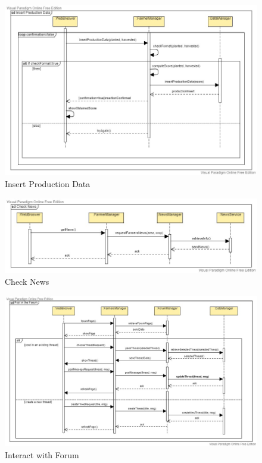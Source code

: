 \documentclass[table, 12pt]{article}
\begin{document}
\begin{center}
    \begin{figure}[H]
        \includegraphics[scale=0.42, center]{assets/SequenceDiagram/InsertProduction.jpg}
        \caption{Insert Production Data}
        \label{fig: production}
    \end{figure}
\end{center}

\begin{center}
    \begin{figure}[H]
        \includegraphics[scale=0.42, center]{assets/SequenceDiagram/CheckNews.jpg}
        \caption{Check News}
        \label{fig: news}
    \end{figure}
\end{center}

\begin{center}
    \begin{figure}[H]
        \includegraphics[scale=0.42, center]{assets/SequenceDiagram/Forum.jpg}
        \caption{Interact with Forum}
        \label{fig: forum}
    \end{figure}
\end{center}
\end{document}
